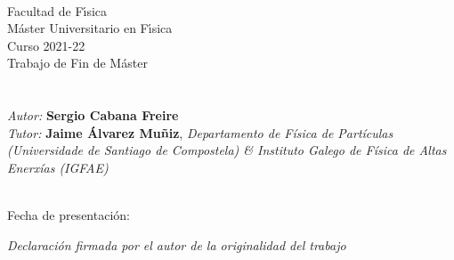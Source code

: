 \documentclass[11 pt, a4paper]{article} %
\numberwithin{equation}{section}
\numberwithin{figure}{section}
\numberwithin{table}{section}
\begin{document}
	
	
	\mbox{}
	\mbox{}\hfill{\large \DataDefensa} \vspace{1cm}
	
	\begin{center}
	\end{center}
	
	
	\clearpage
	\mbox{}
	\clearpage %
	
	
	\mbox{}\\
	Facultad de F\'{\i}sica\\
	Máster Universitario en F\'{\i}sica \\  
	Curso 2021-22\\%
	{\sc Trabajo de Fin de Máster}\vspace{3cm}\\
	{\sc\LARGE \TituloDoTraballo}\vspace{1cm}\\
	{\sl\large \EspecialidadeMaster}\vspace{2cm}\\
	{\sl Autor:} {\bf Sergio Cabana Freire}\\ %
	{\sl Tutor:} {\bf Jaime Álvarez Muñiz}, {\sl Departamento de Física de Partículas (Universidade de Santiago de Compostela) \& Instituto Galego de Física de Altas Enerxías (IGFAE)}\\
	\vspace{1cm}\\
	
	\mbox{}
	
	\mbox{}\hfill{Fecha de presentaci\'on: \DataDefensa}
	
	
	\clearpage
	
	\thispagestyle{empty}
	\pagebreak
	
	{\sl Declaraci\'on firmada por el autor de la originalidad del trabajo}
	
\end{document}
